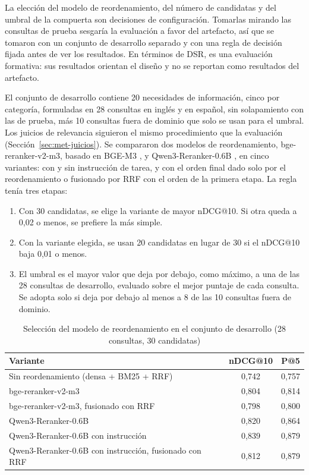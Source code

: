 La elección del modelo de reordenamiento, del número de candidatas y del umbral de la compuerta son decisiones de configuración. Tomarlas mirando las consultas de prueba sesgaría la evaluación a favor del artefacto, así que se tomaron con un conjunto de desarrollo separado y con una regla de decisión fijada antes de ver los resultados. En términos de DSR, es una evaluación formativa: sus resultados orientan el diseño y no se reportan como resultados del artefacto.

El conjunto de desarrollo contiene 20 necesidades de información, cinco por categoría, formuladas en 28 consultas en inglés y en español, sin solapamiento con las de prueba, más 10 consultas fuera de dominio que solo se usan para el umbral. Los juicios de relevancia siguieron el mismo procedimiento que la evaluación (Sección~\ref{sec:met-juicios}). Se compararon dos modelos de reordenamiento, bge-reranker-v2-m3, basado en BGE-M3 \citep{Chen2024M3}, y Qwen3-Reranker-0.6B \citep{Zhang2025Qwen3}, en cinco variantes: con y sin instrucción de tarea, y con el orden final dado solo por el reordenamiento o fusionado por RRF con el orden de la primera etapa. La regla tenía tres etapas:
\begin{enumerate}
    \item Con 30 candidatas, se elige la variante de mayor nDCG@10. Si otra queda a 0,02 o menos, se prefiere la más simple.
    \item Con la variante elegida, se usan 20 candidatas en lugar de 30 si el nDCG@10 baja 0,01 o menos.
    \item El umbral es el mayor valor que deja por debajo, como máximo, a una de las 28 consultas de desarrollo, evaluado sobre el mejor puntaje de cada consulta. Se adopta solo si deja por debajo al menos a 8 de las 10 consultas fuera de dominio.
\end{enumerate}

\begin{table}[htbp!]
    \centering
    \caption{Selección del modelo de reordenamiento en el conjunto de desarrollo (28 consultas, 30 candidatas)}
    \label{tab:art-rerank-dev}
    \begin{tabular}{|l|c|c|}
        \hline
        \textbf{Variante} & \textbf{nDCG@10} & \textbf{P@5} \\
        \hline
        Sin reordenamiento (densa + BM25 + RRF) & 0{,}742 & 0{,}757 \\
        \hline
        bge-reranker-v2-m3 & 0{,}804 & 0{,}814 \\
        \hline
        bge-reranker-v2-m3, fusionado con RRF & 0{,}798 & 0{,}800 \\
        \hline
        Qwen3-Reranker-0.6B & 0{,}820 & 0{,}864 \\
        \hline
        Qwen3-Reranker-0.6B con instrucción & 0{,}839 & 0{,}879 \\
        \hline
        Qwen3-Reranker-0.6B con instrucción, fusionado con RRF & 0{,}812 & 0{,}879 \\
        \hline
    \end{tabular}
\end{table}

